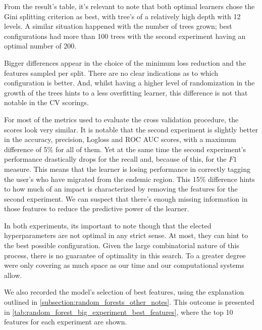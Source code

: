 From the result's table, it's relevant to note that both optimal learners chose the Gini splitting criterion as best, with tree's of a relatively high depth with 12 levels.
A similar situation happened with the number of trees grown; best configurations had more than 100 trees with the second experiment having an optimal number of 200.

Bigger differences appear in the choice of the minimum loss reduction and the features sampled per split.
There are no clear indications as to which configuration is better.
And, whilst having a higher level of randomization in the growth of the trees hints to a less overfitting learner, this difference is not that notable in the CV scorings.

For most of the metrics used to evaluate the cross validation procedure, the scores look very similar. 
It is notable that the second experiment is slightly better in the accuracy, precision, Logloss and ROC AUC scores, with a maximum difference of 5\% for all of them.
Yet at the same time the second experiment's performance drastically drops for the recall and, because of this, for the $F1$ measure.
This means that the learner is losing performance in correctly tagging the user's who have migrated from the endemic region.
This 15\% difference hints to how much of an impact is characterized by removing the features for the second experiment.
We can suspect that there's enough missing information in those features to reduce the predictive power of the learner.

In both experiments, its important to note though that the elected hyperparameters are not optimal in any strict sense.
At most, they can hint to the best possible configuration.
Given the large combinatorial nature of this process, there is no guarantee of optimality in this search.
To a greater degree were only covering as much space as our time and our computational systems allow.


We also recorded the model's selection of best features, using the explanation outlined in \cref{subsection:random_forests_other_notes}.
This outcome is presented in \cref{tab:random_forest_big_experiment_best_features}, where the top 10 features for each experiment are shown.

